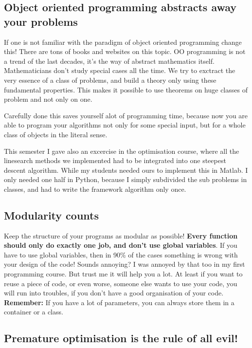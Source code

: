 \documentclass[letterpaper,10pt,english]{manual}
\begin{document}
\subsection{Object oriented programming abstracts away your problems}

If one is not familiar with the paradigm of object oriented programming change this!
There are tons of books and websites on this topic.
OO programming is not a trend of the last decades, it's the way of abstract mathematics itself.
Mathematicians don't study special cases all the time. We try to exctract the very essence of a class
of problems, and build a theory only using these fundamental properties. This makes it possible to
use theorems on huge classes of problem and not only on one.

Carefully done this saves yourself alot of programming time, because now you are able
to program your algorithms not only for some special input, but for a whole class of objects
in the literal sense.

This semester I gave also an excercise in the optimisation course, where
all the linesearch methods we implemented had to be integrated into one steepest descent algorithm.
While my students needed ours to implement this in Matlab. I only needed one half in Python, because
I simply subdivided the sub problems in classes, and had to write the framework algorithm only once.


\subsection{Modularity counts}

Keep the structure of your programs as modular as possible!
\textbf{Every function should only do exactly one job, and don't use
global variables}. If you have to use global variables, then in
90\% of the cases something is wrong with your design of the code!
Sounds annoying? I was annoyed by that too in my first programming
course. But trust me it will help you a lot. At least if you want to
reuse a piece of code, or even worse, someone else wants to use your
code, you will run into troubles, if you don't have a good
organisation of your code. \textbf{Remember:}  If you have a lot of
parameters, you can always store them in a container or a class.


\subsection{Premature optimisation is the rule of all evil!}
\end{document}
